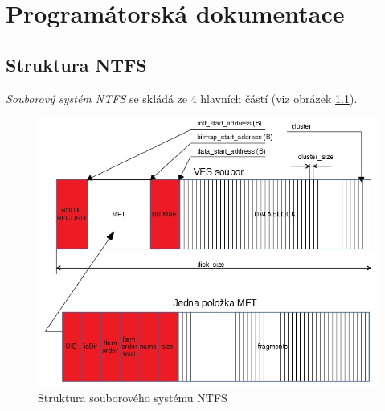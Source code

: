 \documentclass[
11pt,
a4paper,
pdftex,
czech,
titlepage
]{report}
\begin{document}
\chapter{Programátorská dokumentace}
\section{Struktura NTFS}
\textit{Souborový systém NTFS} se skládá ze 4 hlavních částí (viz obrázek \ref{ntfs_struct}).\\

\begin{figure}[!ht]
	\centering
	\includegraphics[width=1\textwidth]{img/zos-ntfs.png}
	\caption{Struktura souborového systému NTFS}
	\label{ntfs_struct}
\end{figure}
\end{document}
